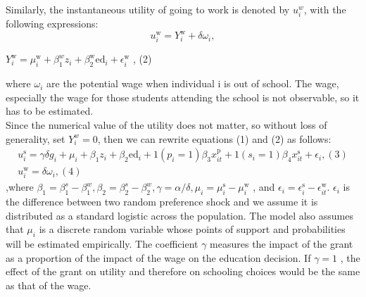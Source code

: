 \documentclass{handoutForSolutions}
\begin{document}
Similarly, the instantaneous utility of going to work is denoted by $u_i^w$, with the following expressions:
$$
u_{i}^{\mathrm{w}}=Y_{i}^{\mathrm{w}}+\delta\omega_{i},
$$
\begin{center}
$Y_{i}^{\mathrm{w}}=\mu_{i}^{\mathrm{w}}+\beta_1^{w}z_{i}+\beta_2^{\mathrm{w}}\mathrm{e}\mathrm{d}_{i}+\epsilon_{i}^{\mathrm{w}}$ ,   (2)
\end{center}
where $\omega_{i}$ are the potential wage when individual i is out of school. The wage, especially the wage for those students attending the school is not observable, so it has to be estimated.\\
Since the numerical value of the utility does not matter, so  without loss of generality, set $Y_{i}^w=0$, then we can rewrite equations (1) and (2) as follows:
\begin{gather*}
    u_{i}^{\mathrm{s}}=\gamma\delta g_{i}+\mu_{i}+\beta_{1}z_{i}+\beta_2\mathrm{e}\mathrm{d}_{i}+1(p_{i}=1)\beta_{3}x_{it}^{\mathrm{p}}+1(s_{i}=1)\beta_{4}x_{it}^{\mathrm{s}}+\epsilon_{i}, (3)\\
u_{i}^{\mathrm{w}}=\delta\omega_{i}, (4)
\end{gather*}
,where $\beta_1=\beta_1^s-\beta_1^w, \beta_2=\beta_2^s-\beta_2^w, \gamma =\alpha/\delta, \mu_{i}=\mu_{i}^{\mathrm{s}}-\mu_{i}^{\mathrm{w}}$ , and $\epsilon_{i}=\epsilon_{i}^{\mathrm{s}}-\epsilon_{it}^{\mathrm{w}}$. $\epsilon_{i}$ is the difference between two random preference shock and we assume it is distributed as a standard logistic across the population. The model also assumes that $\mu_{i}$ is a discrete random variable whose points of support and probabilities will be estimated empirically. The coefficient $\gamma$ measures the impact of the grant as a proportion of the impact of the wage on the education decision. If $\gamma =1$ , the effect of the grant on utility and therefore on schooling choices would be the same as that of the wage.
\end{document}
